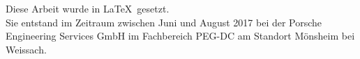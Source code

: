 \thispagestyle{empty}
\null
\vfill
Diese Arbeit wurde in \LaTeX\  gesetzt.\\
Sie entstand im Zeitraum zwischen Juni und August 2017 bei der Porsche Engineering Services GmbH
im Fachbereich PEG-DC am Standort Mönsheim bei Weissach.
